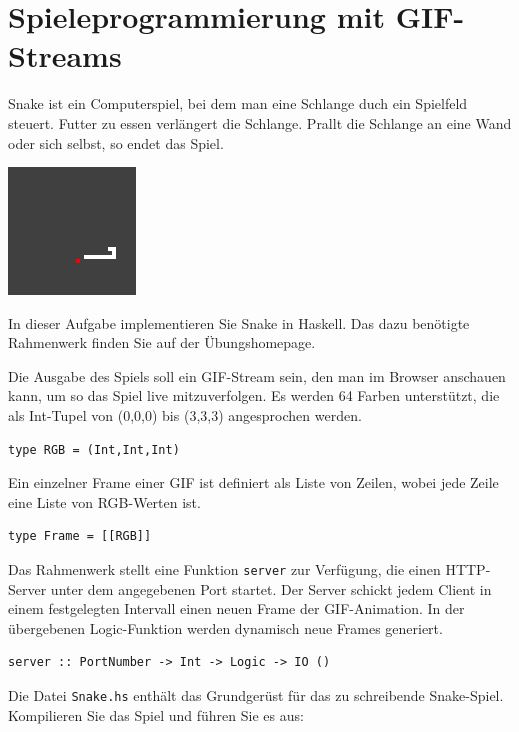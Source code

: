 \documentclass{scrartcl}
\begin{document}
\section{Spieleprogrammierung mit GIF-Streams}

Snake ist ein Computerspiel, bei dem man eine Schlange duch ein Spielfeld steuert.
Futter zu essen verlängert die Schlange.
Prallt die Schlange an eine Wand oder sich selbst, so endet das Spiel.

\begin{center}
\includegraphics{snake}
\end{center}

In dieser Aufgabe implementieren Sie Snake in Haskell.
Das dazu benötigte Rahmenwerk finden Sie auf der Übungshomepage.

Die Ausgabe des Spiels soll ein GIF-Stream sein, den man im Browser anschauen kann, um so das Spiel live mitzuverfolgen.
Es werden 64 Farben unterstützt, die als Int-Tupel von (0,0,0) bis (3,3,3) angesprochen werden.

\begin{lstlisting}
type RGB = (Int,Int,Int)
\end{lstlisting}

Ein einzelner Frame einer GIF ist definiert als Liste von Zeilen, wobei jede Zeile eine Liste von RGB-Werten ist.

\begin{lstlisting}
type Frame = [[RGB]]
\end{lstlisting}

Das Rahmenwerk stellt eine Funktion \texttt{server} zur Verfügung, die einen HTTP-Server unter dem angegebenen Port startet.
Der Server schickt jedem Client in einem festgelegten Intervall einen neuen Frame der GIF-Animation.
In der übergebenen Logic-Funktion werden dynamisch neue Frames generiert.

\begin{lstlisting}
server :: PortNumber -> Int -> Logic -> IO ()
\end{lstlisting}

Die Datei \texttt{Snake.hs} enthält das Grundgerüst für das zu schreibende Snake-Spiel.
Kompilieren Sie das Spiel und führen Sie es aus:
\end{document}
